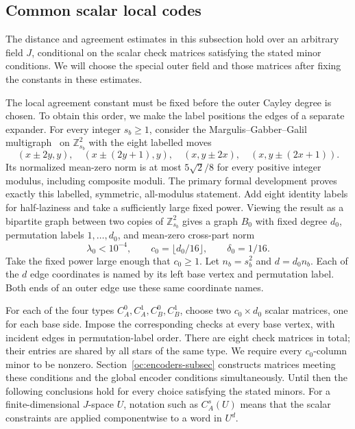 \subsection{Common scalar local codes}

The distance and agreement estimates in this subsection hold over an
arbitrary field $J$, conditional on the scalar check matrices satisfying
the stated minor conditions.  We will choose the special outer field
and those matrices after fixing the constants in these estimates.

The local agreement constant must be fixed before the outer Cayley
degree is chosen.  To obtain this order, we make the label positions
the edges of a separate expander.  For every integer $s_b\ge1$, consider
the Margulis--Gabber--Galil multigraph~\cite{Margulis1973,GabberGalil1981}
on $\mathbb Z_{s_b}^2$ with the
eight labelled moves
\[
 (x\mathbin\pm2y,y),\quad (x\mathbin\pm(2y+1),y),\quad
 (x,y\mathbin\pm2x),\quad (x,y\mathbin\pm(2x+1)).
\]
Its normalized mean-zero norm is at most $5\sqrt2/8$ for every positive
integer modulus, including composite moduli.  The primary formal
development \cite[\texttt{mgg\_graph\_step},
\texttt{mgg\_numerical\_radius}]{MGGAFP} proves exactly this labelled,
symmetric, all-modulus statement.  Add eight identity labels for
half-laziness and take a sufficiently large fixed power.  Viewing the
result as a bipartite graph between two copies of $\mathbb Z_{s_b}^2$
gives a graph $B_0$ with fixed degree $d_0$, permutation labels
$1,\ldots,d_0$, and mean-zero cross-part norm
\begin{equation}\label{oc:base-parameters}
 \lambda_0<10^{-4},\qquad
 c_0=\lfloor d_0/16\rfloor,\qquad \delta_0=1/16.
\end{equation}
Take the fixed power large enough that $c_0\ge1$.
Let $n_b=s_b^2$ and $d=d_0n_b$.  Each of the $d$ edge coordinates
is named by its left base vertex and permutation label.  Both ends
of an outer edge use these same coordinate names.

For each of the four types $C_A^0,C_A^1,C_B^0,C_B^1$, choose two
$c_0\times d_0$ scalar matrices, one for each base side.  Impose the
corresponding checks at every base vertex, with incident edges in
permutation-label order.  There are eight check matrices in total;
their entries are shared by all stars of the same type.  We require
every $c_0$-column minor to be nonzero.  Section~\ref{oc:encoders-subsec}
constructs matrices meeting these conditions and the global encoder
conditions simultaneously.  Until then the following conclusions hold
for every choice satisfying the stated minors.  For a finite-dimensional
$J$-space $U$, notation such as $C_A^s(U)$ means that the scalar
constraints are applied componentwise to a word in $U^d$.

